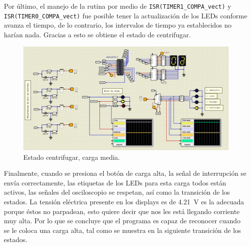Por último, el manejo de la rutina por medio de \texttt{ISR(TIMER1\_COMPA\_vect)} y \texttt{ISR(TIMER0\_COMPA\_vect)} fue posible tener la actualización de los LEDs conforme avanza el tiempo, de lo contrario, los intervalos de tiempo ya establecidos no harían nada. Gracias a esto se obtiene el estado de centrifugar.
\begin{figure}[H]
        \centering
        \includegraphics[width=.7\linewidth]{Imagenes/16.png}
        \caption{Estado centrifugar, carga media.}
        \label{fig22}
    \end{figure}
Finalmente, cuando se presiona el botón de carga alta, la señal de interrupción se envía correctamente, las etiquetas de los LEDs para esta carga todos están activos, las señales del osciloscopio se respetan, así como la transición de los estados. La tensión eléctrica presente en los displays es de \SI{4.21}{\volt} es la adecuada porque éstos no parpadean, esto quiere decir que nos les está llegando corriente muy alta. Por lo que se concluye que el programa es capaz de reconocer cuando se le coloca una carga alta, tal como se muestra en la siguiente transición de los estados.
